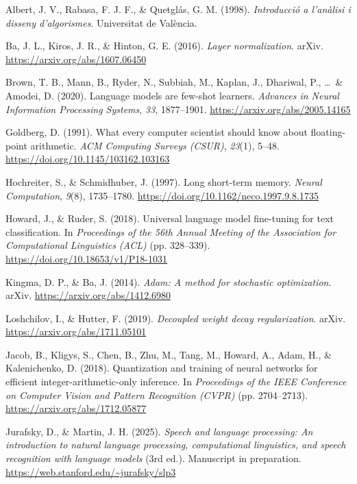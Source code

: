 \documentclass[12pt,twoside]{article}
\begin{document}
\begin{thebibliography}{100}




 Albert, J. V., Rabasa, F. J. F., \& Quetglás, G. M. (1998). \textit{Introducció a l’anàlisi i disseny d’algorismes}. Universitat de València.

 Ba, J. L., Kiros, J. R., \& Hinton, G. E. (2016). \textit{Layer normalization}. arXiv. \url{https://arxiv.org/abs/1607.06450}

 Brown, T. B., Mann, B., Ryder, N., Subbiah, M., Kaplan, J., Dhariwal, P., \ldots\ \& Amodei, D. (2020). Language models are few-shot learners. \textit{Advances in Neural Information Processing Systems}, \textit{33}, 1877--1901. \url{https://arxiv.org/abs/2005.14165}

 Goldberg, D. (1991). What every computer scientist should know about floating-point arithmetic. \textit{ACM Computing Surveys (CSUR)}, \textit{23}(1), 5--48. \url{https://doi.org/10.1145/103162.103163}

 Hochreiter, S., \& Schmidhuber, J. (1997). Long short-term memory. \textit{Neural Computation}, \textit{9}(8), 1735--1780. \url{https://doi.org/10.1162/neco.1997.9.8.1735}

 Howard, J., \& Ruder, S. (2018). Universal language model fine-tuning for text classification. In \textit{Proceedings of the 56th Annual Meeting of the Association for Computational Linguistics (ACL)} (pp. 328--339). \url{https://doi.org/10.18653/v1/P18-1031}

 Kingma, D. P., \& Ba, J. (2014). \textit{Adam: A method for stochastic optimization}. arXiv. \url{https://arxiv.org/abs/1412.6980}

 Loshchilov, I., \& Hutter, F. (2019). \textit{Decoupled weight decay regularization}. arXiv. \url{https://arxiv.org/abs/1711.05101}

 Jacob, B., Kligys, S., Chen, B., Zhu, M., Tang, M., Howard, A., Adam, H., \& Kalenichenko, D. (2018). Quantization and training of neural networks for efficient integer-arithmetic-only inference. In \textit{Proceedings of the IEEE Conference on Computer Vision and Pattern Recognition (CVPR)} (pp. 2704--2713). \url{https://arxiv.org/abs/1712.05877}

 Jurafsky, D., \& Martin, J. H. (2025). \textit{Speech and language processing: An introduction to natural language processing, computational linguistics, and speech recognition with language models} (3rd ed.). Manuscript in preparation. \url{https://web.stanford.edu/~jurafsky/slp3}


\end{thebibliography}
\end{document}
